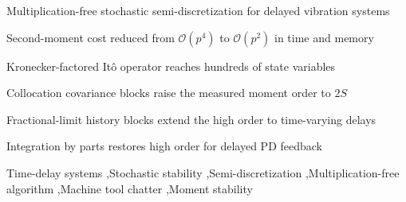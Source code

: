 \documentclass[preprint,12pt]{elsarticle}
\begin{document}
\begin{frontmatter}
\begin{highlights}
\item Multiplication-free stochastic semi-discretization for delayed vibration systems
\item Second-moment cost reduced from $\mathcal{O}(p^4)$ to $\mathcal{O}(p^2)$ in time and memory
\item Kronecker-factored It\^o operator reaches hundreds of state variables
\item Collocation covariance blocks raise the measured moment order to $2S$
\item Fractional-limit history blocks extend the high order to time-varying delays
\item Integration by parts restores high order for delayed PD feedback
\end{highlights}

\begin{keyword}
Time-delay systems \sep Stochastic stability \sep Semi-discretization \sep Multiplication-free algorithm \sep Machine tool chatter \sep Moment stability
\end{keyword}

\end{frontmatter}
\end{document}
